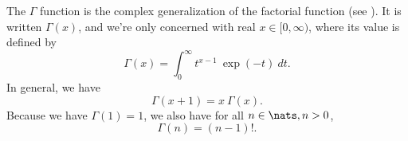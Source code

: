The $\Gamma$ function is the complex generalization of the factorial
function (see ).  It is written $\Gamma(x)$, 
and we're only concerned with real $x \in [0,\infty)$, where its value
is defined by 
%
\begin{equation}
\Gamma(x) = \int_0^{\infty} t^{x-1} \ \exp(-t) \ dt.
\end{equation}
%
In general, we have
%
\begin{equation}
\Gamma(x+1) = x \ \Gamma(x).
\end{equation}
%
Because we have $\Gamma(1) = 1$, we also have for all $n \in \nats, n > 0$, 
%
\begin{equation}
\Gamma(n) = (n-1)!.
\end{equation}

